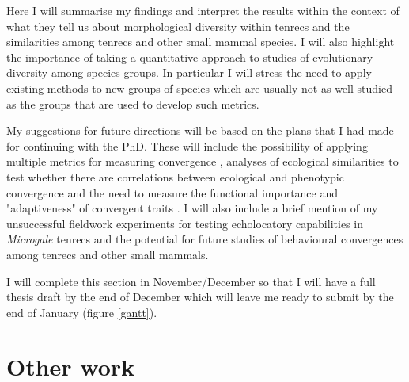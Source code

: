 \documentclass[12pt,a4paper]{article}
\begin{document}
	Here I will summarise my findings and interpret the results within the context of what they tell us about morphological diversity within tenrecs and the similarities among tenrecs and other small mammal species. I will also highlight the importance of taking a quantitative approach to studies of evolutionary diversity among species groups. In particular I will stress the need to apply existing methods to new groups of species which are usually not as well studied as the groups that are used to develop such metrics. %

	My suggestions for future directions will be based on the plans that I had made for continuing with the PhD. These will include the possibility of applying multiple metrics for measuring convergence \citep[e.g.][]{Ingram2013, Segar2013, Harmon2005}, analyses of ecological similarities to test whether there are correlations between ecological and phenotypic convergence \citep[e.g.][]{Moen2013} and the need to measure the functional importance and "adaptiveness" of convergent traits \citep{Losos2010}. I will also include a brief mention of my unsuccessful fieldwork experiments for testing echolocatory capabilities in \textit{Microgale} tenrecs and the potential for future studies of behavioural convergences among tenrecs and other small mammals.


	I will complete this section in November/December so that I will have a full thesis draft by the end of December which will leave me ready to submit by the end of January (figure \ref{gantt}).


\section{Other work}
	
\end{document}

